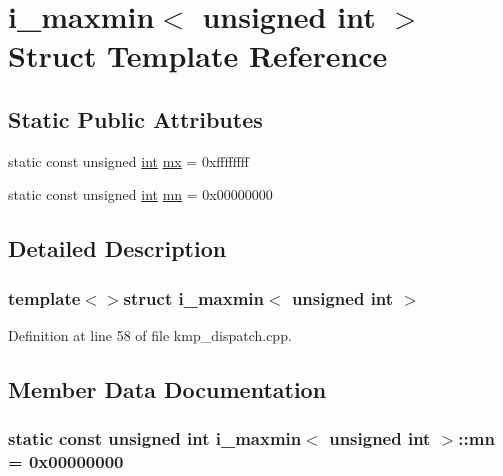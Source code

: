 \hypertarget{structi__maxmin_3_01unsigned_01int_01_4}{\section{i\-\_\-maxmin$<$ unsigned int $>$ Struct Template Reference}
\label{structi__maxmin_3_01unsigned_01int_01_4}
}
\subsection*{Static Public Attributes}
\begin{DoxyCompactItemize}
\item 
static const unsigned \hyperlink{ittnotify__static_8h_a8b8dcd723308a8cb5d84277c7a3fff70}{int} \hyperlink{structi__maxmin_3_01unsigned_01int_01_4_a0c4673841eea0b582b09f506e4d29105}{mx} = 0xffffffff
\item 
static const unsigned \hyperlink{ittnotify__static_8h_a8b8dcd723308a8cb5d84277c7a3fff70}{int} \hyperlink{structi__maxmin_3_01unsigned_01int_01_4_a13bbcc86a6bd1134d65335587a5071fc}{mn} = 0x00000000
\end{DoxyCompactItemize}


\subsection{Detailed Description}
\subsubsection*{template$<$$>$struct i\-\_\-maxmin$<$ unsigned int $>$}



Definition at line 58 of file kmp\-\_\-dispatch.\-cpp.



\subsection{Member Data Documentation}
\hypertarget{structi__maxmin_3_01unsigned_01int_01_4_a13bbcc86a6bd1134d65335587a5071fc}{
\subsubsection[{mn}]{\setlength{\rightskip}{0pt plus 5cm}static const unsigned {\bf int} {\bf i\-\_\-maxmin}$<$ unsigned {\bf int} $>$\-::mn = 0x00000000\hspace{0.3cm}{\ttfamily [static]}}}\label{structi__maxmin_3_01unsigned_01int_01_4_a13bbcc86a6bd1134d65335587a5071fc}


